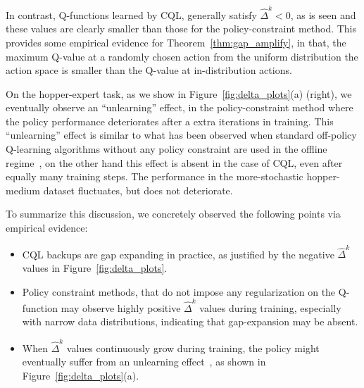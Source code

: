 In contrast, Q-functions learned by CQL, generally satisfy $\hat{\Delta}^k < 0$, as is seen  and these values are clearly smaller than those for the policy-constraint method. This provides some empirical evidence for Theorem~\ref{thm:gap_amplify}, in that, the maximum Q-value at a randomly chosen action from the uniform distribution the action space is smaller than the Q-value at in-distribution actions.

On the hopper-expert task, as we show in Figure~\ref{fig:delta_plots}(a) (right), we eventually observe an ``unlearning'' effect, in the policy-constraint method where the policy performance deteriorates after a extra iterations in training. This ``unlearning'' effect is similar to what has been observed when standard off-policy Q-learning algorithms without any policy constraint are used in the offline regime~\citep{kumar2019stabilizing,levine2020offline}, on the other hand this effect is absent in the case of CQL, even after equally many training steps. The performance in the more-stochastic hopper-medium dataset fluctuates, but does not deteriorate.

To summarize this discussion, we concretely observed the following points via empirical evidence:
\begin{itemize}
\vspace{-10pt}
    \item CQL backups are gap expanding in practice, as justified by the negative $\hat{\Delta}^k$ values in Figure~\ref{fig:delta_plots}.
    \item Policy constraint methods, that do not impose any regularization on the Q-function may observe highly positive $\hat{\Delta}^k$ values during training, especially with narrow data distributions, indicating that gap-expansion may  be absent.
    \item When $\hat{\Delta}^k$ values continuously grow during training, the policy might eventually suffer from an unlearning effect~\citep{levine2020offline}, as shown in Figure~\ref{fig:delta_plots}(a).
    \vspace{-10pt}
\end{itemize}


